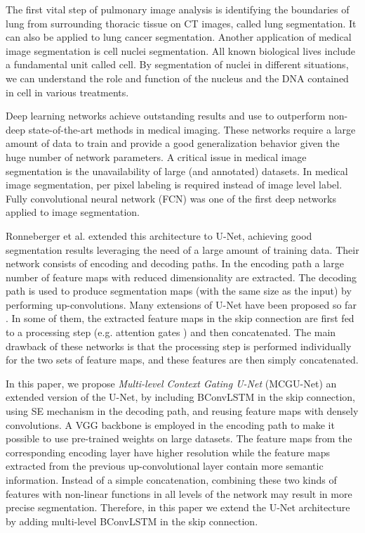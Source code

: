 \documentclass[journal]{IEEEtran}
\begin{document}
 



The first vital step of pulmonary image analysis is identifying the boundaries of lung from surrounding thoracic tissue on CT images, called lung segmentation. It can also be applied to lung cancer segmentation. 
Another application of medical image segmentation is cell nuclei segmentation. All known biological lives include a fundamental unit called cell. By segmentation of nuclei in different situations, we can understand the role and function of the nucleus and the DNA contained in cell in various treatments.



Deep learning networks achieve outstanding results and use to outperform non-deep state-of-the-art methods in medical imaging. 
These networks require a large amount of data to train and provide a good generalization behavior given the huge number of network parameters. A critical issue in medical image segmentation is the unavailability of large (and annotated) datasets. In medical image segmentation, per pixel labeling is required instead of image level label. 
Fully convolutional neural network (FCN) \cite{long2015fully} was one of the first deep networks applied to image segmentation.

Ronneberger et al. \cite{ronneberger2015} extended this architecture to U-Net, achieving good segmentation results leveraging the need of a large amount of training data. Their network consists of encoding and decoding paths. In the encoding path a large number of feature maps with reduced dimensionality are extracted. The decoding path is used to produce segmentation maps (with the same size as the input) by performing up-convolutions.
Many extensions of U-Net have been proposed so far \cite{alom2018,oktay2018,azad2019bi}.
In some of them, the extracted feature maps in the skip connection are first fed to a processing step (e.g. attention gates \cite{oktay2018}) and then concatenated. The main drawback of these networks is that the processing step is performed individually for the two sets of feature maps, and these features are then simply concatenated. 



In this paper,  we propose \textit{Multi-level Context Gating U-Net} (MCGU-Net)
 an extended version of the U-Net, by including BConvLSTM \cite{song2018pyramid} in the skip connection, using SE mechanism in the decoding path, and reusing feature maps with densely convolutions. A VGG backbone is employed in the encoding path to make it possible to use pre-trained weights on large datasets. The feature maps from the corresponding encoding layer have higher resolution while the feature maps extracted from the previous up-convolutional layer contain more semantic information. Instead of a simple concatenation, combining these two kinds of features with non-linear functions in all levels of the network may result in more precise segmentation. Therefore, in this paper we extend the U-Net architecture by adding multi-level BConvLSTM in the skip connection. 
\end{document}
